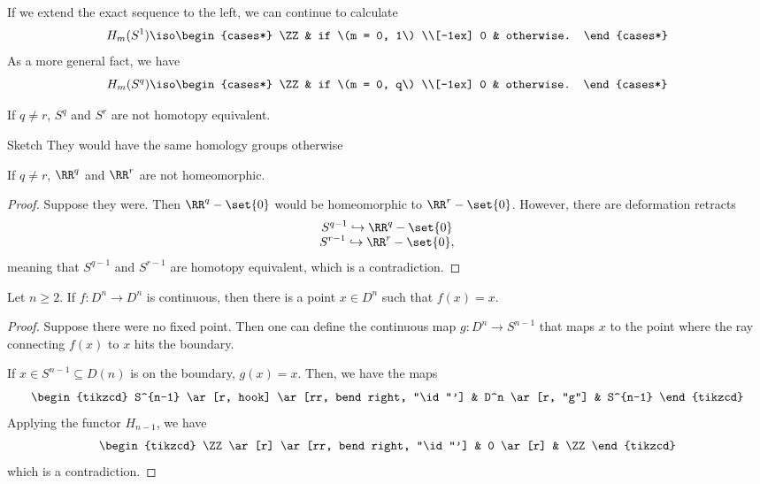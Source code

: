 \documentclass{standalone}
\begin{document}
If we extend the exact sequence to the left, we can continue to calculate
\[
  H_m(S^1) \iso \begin{cases*}
    \ZZ & if \(m = 0, 1\) \\[-1ex]
    0   & otherwise.
  \end{cases*}
\]
As a more general fact, we have
\[
  H_m(S^q) \iso \begin{cases*}
    \ZZ & if \(m = 0, q\) \\[-1ex]
    0   & otherwise.
  \end{cases*}
\]


\begin{corollary}
  If \(q \neq r\), \(S^q\) and \(S^r\) are not homotopy equivalent.
\end{corollary}
\begin{proof*}{Sketch}
  They would have the same homology groups otherwise
\end{proof*}
\begin{corollary}
  If \(q \neq r\), \(\RR^q\) and \(\RR^r\) are not homeomorphic.
\end{corollary}
\begin{proof}
  Suppose they were. Then \(\RR^q - \set{0}\) would be homeomorphic to
  \(\RR^r - \set{0}\). However, there are deformation retracts
  \begin{gather*}
    S^{q-1} \hookrightarrow \RR^q - \set{0} \\[-1ex]
    S^{r-1} \hookrightarrow \RR^r - \set{0},
  \end{gather*}
  meaning that \(S^{q-1}\) and \(S^{r-1}\) are homotopy equivalent,
  which is a contradiction.
\end{proof}


\begin{theorem}
  Let \(n \geq 2\).
  If \(f \colon D^n \to D^n\) is continuous, then there is a point
  \(x \in D^n\) such that \(f(x) = x\).
\end{theorem}
\begin{proof}
  Suppose there were no fixed point. Then one can define the continuous map
  \(g \colon D^n \to S^{n-1}\) that maps \(x\) to the point where the ray
  connecting \(f(x)\) to \(x\) hits the boundary.
  
  If \(x \in S^{n-1} \subseteq D(n)\) is on the boundary, \(g(x) = x\).
  Then, we have the maps
  \[
    \begin{tikzcd}
      S^{n-1} \ar[r, hook] \ar[rr, bend right, "\id"'] &
      D^n \ar[r, "g"] &
      S^{n-1}
    \end{tikzcd}
  \]
  Applying the functor \(H_{n-1}\), we have
  \[
    \begin{tikzcd}
      \ZZ \ar[r] \ar[rr, bend right, "\id"'] &
      0 \ar[r] &
      \ZZ
    \end{tikzcd}
  \]
  which is a contradiction.
\end{proof}
\end{document}
